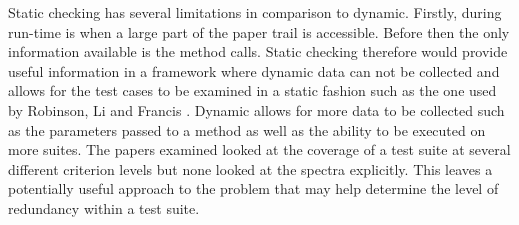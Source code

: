 Static checking has several limitations in comparison to dynamic. Firstly, during run-time is when a large part of the paper trail is accessible. Before then the only information available is the method calls.  Static checking therefore would provide useful information in a framework where dynamic data can not be collected and allows for the test cases to be examined in a static fashion such as the one used by Robinson, Li and Francis \cite{li2008static}. Dynamic allows for more data to be collected such as the parameters passed to a method as well as the ability to be executed on more suites. The papers examined looked at the coverage of a test suite at several different criterion levels but none looked at the spectra explicitly. This leaves a potentially useful approach to the problem that may help determine the level of redundancy within a test suite. 

